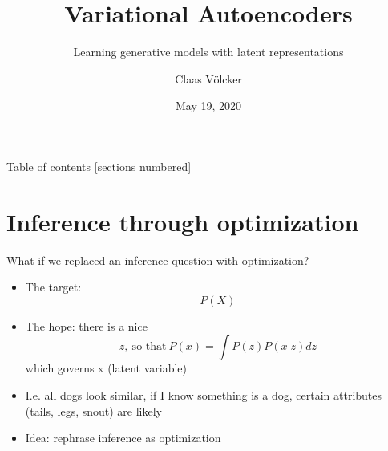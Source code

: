 \documentclass[10pt,aspectratio=169]{beamer}
\title{Variational Autoencoders}
\subtitle{Learning generative models with latent representations}
\date{May 19, 2020}
\author{Claas Völcker}
\institute{Deep Generative Models - SoSe 2020}
\begin{document}

\maketitle


\begin{frame}{Table of contents}
[sections numbered]
\tableofcontents[hideallsubsections]
\end{frame}


\section{Inference through optimization}

\begin{frame}{What if we replaced an inference question with optimization?}
    \begin{itemize}[<+->]
        \item The target: $$P(X)$$
        \item The hope: there is a nice $$z,~\text{so that}~P(x) = \int P(z)P(x|z)dz$$ which governs x (latent variable)
        \item I.e. all dogs look similar, if I know something is a dog, certain attributes (tails, legs, snout) are likely
        \item Idea: rephrase inference as optimization
    \end{itemize}
\end{frame}

\end{document}
